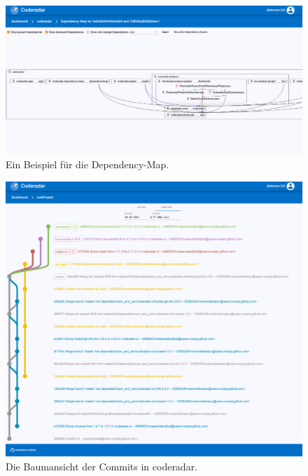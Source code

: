 \documentclass[
	oneside,  %
	ngerman, 
	final, 
	11pt, 
	a4paper, 
	1.1headlines, 
	headinclude=false, 
	footinclude=false, 
	mpinclude=false, 
	pagesize, 
	onecolumn, 
	titlepage, 
	parskip=half, 
	headsepline, 
	chapterprefix=false, 
	version=first, 
	listof=totoc, 
	bibliography=totoc, 
	toc=graduated, 
	fleqn
]{scrbook}
\begin{document}
\begin{figure}[htb]
	\begin{center}
		\includegraphics[width=\linewidth]{images/dependency_map}
		\caption{Ein Beispiel für die Dependency-Map.}
		\label{dependency_map}
	\end{center}
\end{figure}

\begin{figure}[htb]
	\begin{center}
		\includegraphics[width=\linewidth]{images/tree_view}
		\caption{Die Baumansicht der Commits in coderadar.}
		\label{tree_view}
	\end{center}
\end{figure}

\end{document}
